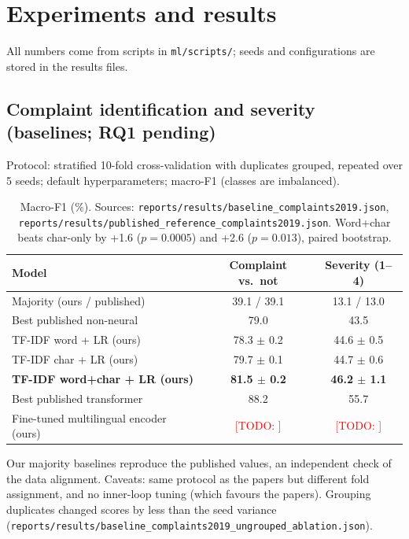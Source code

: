 \documentclass[11pt,a4paper]{article}
\newcommand{\todo}[1]{\textcolor{red}{[TODO: #1]}}
\newcommand{\res}[1]{\texttt{\small reports/results/#1}}
\begin{document}
\section{Experiments and results}
All numbers come from scripts in \texttt{ml/scripts/}; seeds and configurations are stored in the
results files.

\subsection{Complaint identification and severity (baselines; RQ1 pending)}
Protocol: stratified 10-fold cross-validation with duplicates grouped, repeated over 5 seeds; default
hyperparameters; macro-F1 (classes are imbalanced).

\begin{table}[h]
\centering\small
\begin{tabular}{lcc}
\toprule
Model & Complaint vs.\ not & Severity (1--4) \\
\midrule
Majority (ours / published) & 39.1 / 39.1 & 13.1 / 13.0 \\
Best published non-neural & 79.0 & 43.5 \\
TF-IDF word + LR (ours) & 78.3 $\pm$ 0.2 & 44.6 $\pm$ 0.5 \\
TF-IDF char + LR (ours) & 79.7 $\pm$ 0.1 & 44.7 $\pm$ 0.6 \\
\textbf{TF-IDF word+char + LR (ours)} & \textbf{81.5 $\pm$ 0.2} & \textbf{46.2 $\pm$ 1.1} \\
Best published transformer & 88.2 & 55.7 \\
Fine-tuned multilingual encoder (ours) & \todo{} & \todo{} \\
\bottomrule
\end{tabular}
\caption{Macro-F1 (\%). Sources: \res{baseline\_complaints2019.json},
\res{published\_reference\_complaints2019.json}. Word+char beats char-only by +1.6 ($p=0.0005$) and
+2.6 ($p=0.013$), paired bootstrap.}
\end{table}

Our majority baselines reproduce the published values, an independent check of the data alignment.
Caveats: same protocol as the papers but different fold assignment, and no inner-loop tuning (which
favours the papers). Grouping duplicates changed scores by less than the seed variance
(\res{baseline\_complaints2019\_ungrouped\_ablation.json}).
\end{document}
